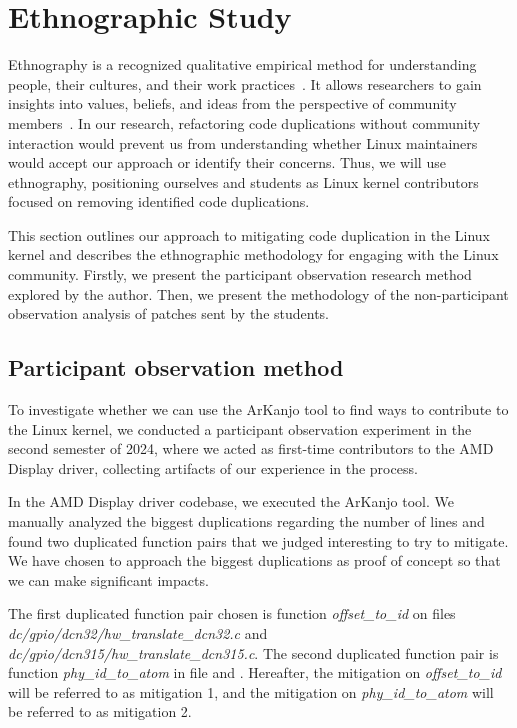 \section{Ethnographic Study}
\label{sec:meteth}

Ethnography is a recognized qualitative empirical method for understanding people, 
their cultures, and their work practices~\citep{bookethno}. It allows researchers 
to gain insights into values, beliefs, and ideas from the perspective of community 
members~\citep{ethnosoft}. In our research, refactoring code duplications without 
community interaction would prevent us from understanding whether Linux maintainers 
would accept our approach or identify their concerns. Thus, we will use ethnography, 
positioning ourselves and students as Linux kernel contributors focused on removing 
identified code duplications.

This section outlines our approach to mitigating code duplication in the Linux kernel 
and describes the ethnographic methodology for engaging with the Linux community. 
Firstly, we present the participant observation research method explored by the author. 
Then, we present the methodology of the non-participant observation analysis of patches 
sent by the students.

\subsection{Participant observation method}
\label{subsec:partmethod}

To investigate whether we can use the ArKanjo tool to find ways to contribute to the 
Linux kernel, we conducted a participant observation experiment in the second semester 
of 2024, where we acted as first-time contributors to the AMD Display driver, collecting 
artifacts of our experience in the process.

In the AMD Display driver codebase, we executed the ArKanjo tool. 
We manually analyzed the biggest duplications regarding the number of lines and found 
two duplicated function pairs that we judged interesting to try to mitigate. We 
have chosen to approach the biggest duplications as proof of concept so that we 
can make significant impacts. 

The first duplicated function pair chosen is function \textit{offset\_to\_id} on files \textit{dc/gpio/dcn32/hw\_translate\_dcn32.c} and \textit{dc/gpio/dcn315/hw\_translate\_dcn315.c}. The second duplicated function pair is function \textit{phy\_id\_to\_atom} in file 
\textit{ } and \textit{}.
Hereafter, the mitigation on \textit{offset\_to\_id} will be referred to as mitigation 1, and the mitigation on 
\textit{phy\_id\_to\_atom} will be referred to as mitigation 2.

